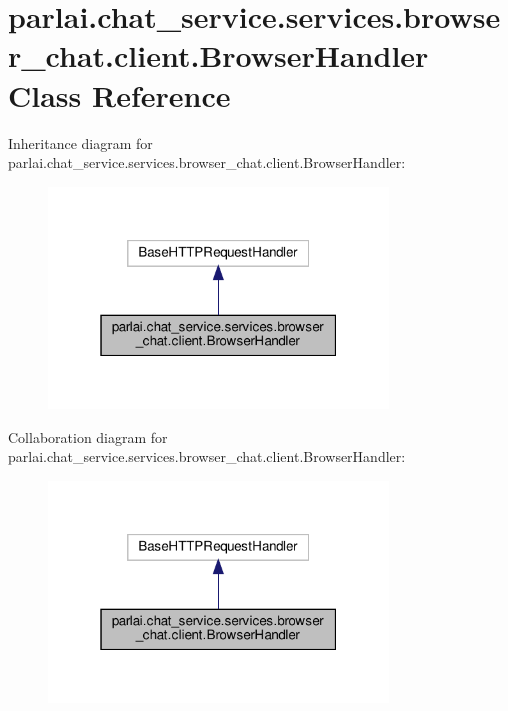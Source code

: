 \hypertarget{classparlai_1_1chat__service_1_1services_1_1browser__chat_1_1client_1_1BrowserHandler}{}\section{parlai.\+chat\+\_\+service.\+services.\+browser\+\_\+chat.\+client.\+Browser\+Handler Class Reference}
\label{classparlai_1_1chat__service_1_1services_1_1browser__chat_1_1client_1_1BrowserHandler}


Inheritance diagram for parlai.\+chat\+\_\+service.\+services.\+browser\+\_\+chat.\+client.\+Browser\+Handler\+:
\nopagebreak
\begin{figure}[H]
\begin{center}
\leavevmode
\includegraphics[width=256pt]{dc/db8/classparlai_1_1chat__service_1_1services_1_1browser__chat_1_1client_1_1BrowserHandler__inherit__graph}
\end{center}
\end{figure}


Collaboration diagram for parlai.\+chat\+\_\+service.\+services.\+browser\+\_\+chat.\+client.\+Browser\+Handler\+:
\nopagebreak
\begin{figure}[H]
\begin{center}
\leavevmode
\includegraphics[width=256pt]{d7/d9b/classparlai_1_1chat__service_1_1services_1_1browser__chat_1_1client_1_1BrowserHandler__coll__graph}
\end{center}
\end{figure}
